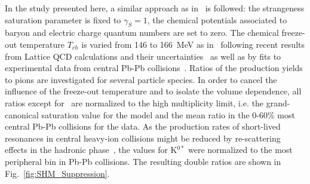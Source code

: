 In the study presented here, a similar approach as in~\cite{Adam:2015vsf} is followed: the strangeness saturation parameter is fixed to $\gamma_S = 1$, the chemical potentials associated to baryon and electric charge quantum numbers are set to zero. The chemical freeze-out temperature $T_{ch}$ is varied from 146 to 166~MeV as in~\cite{Adam:2015vsf} following recent results from  Lattice QCD calculations and their uncertainties~\cite{Bazavov:2014pvz} as well as by fits to experimental data from central Pb-Pb collisions~\cite{Acharya:2017bso,Andronic:2017pug}. Ratios of the production yields to pions are investigated for several particle species. In order to cancel the influence of the freeze-out temperature and to isolate the volume dependence, all ratios except for \kstar\ are normalized to the high multiplicity limit, i.e. the grand-canonical saturation value for the model and the mean ratio in the 0-60\% most central Pb-Pb collisions for the data.
As the production rates of short-lived resonances in central heavy-ion collisions might be reduced by re-scattering effects in the hadronic phase~\cite{Abelev:2014uua,Adam:2016bpr}, the values for K$^{0*}$ were normalized to the most peripheral bin in Pb-Pb collisions. The resulting double ratios are shown in Fig.~\ref{fig:SHM_Suppression}.

